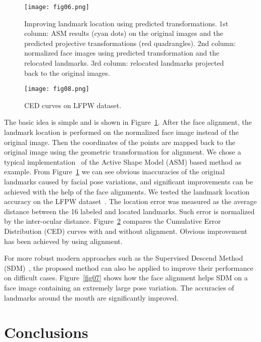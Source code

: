 \documentclass[10pt,twocolumn,letterpaper]{article}
\begin{document}
\begin{figure}[t]
\begin{center}
\texttt{[image: fig06.png]}
\end{center}
   \caption{Improving landmark location using predicted transformations. 1st column: ASM results (cyan dots) on the original images and the predicted projective transformations (red quadrangles). 2nd column: normalized face images using predicted transformation and the relocated landmarks. 3rd column: relocated landmarks projected back to the original images.}
\label{fig06}
\end{figure}

\begin{figure}[b]
\begin{center}
\texttt{[image: fig08.png]}
\end{center}
   \caption{CED curves on LFPW dataset.}
\label{fig08}
\end{figure}

The basic idea is simple and is shown in Figure~\ref{fig06}. 
After the face alignment, the landmark location is performed on the normalized face image instead of the original image. 
Then the coordinates of the points are mapped back to the original image using the geometric transformation for alignment. 
We chose a typical implementation~\cite{Milborrow2014} of the Active Shape Model (ASM) based method as example. 
From Figure~\ref{fig06} we can see obvious inaccuracies of the original landmarks caused by facial pose variations, and significant improvements can be achieved with the help of the face alignments.
We tested the landmark location accuracy on the LFPW dataset~\cite{Belhumeur2011Localizing}.
The location error was measured as the average distance between the 16 labeled and located landmarks.
Such error is normalized by the inter-ocular distance.
Figure~\ref{fig08} compares the Cumulative Error Distribution (CED) curves with and without alignment.
Obvious improvement has been achieved by using alignment.

For more robust modern approaches such as the Supervised Descend Method (SDM)~\cite{xiong2013supervised}, the proposed method can also be applied to improve their performance on difficult cases.
Figure~\ref{fig07} shows how the face alignment helps SDM on a face image containing an extremely large pose variation.
The accuracies of landmarks around the mouth are significantly improved.

\section{Conclusions}
\end{document}
